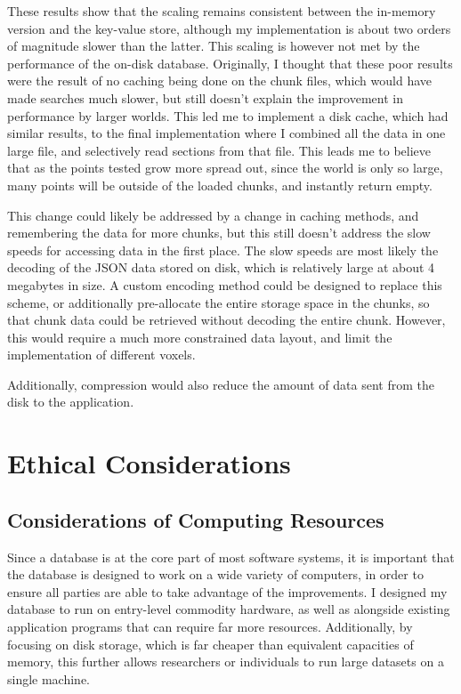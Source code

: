 \documentclass[10pt,twocolumn]{article}
\begin{document}
These results show that the scaling remains consistent between the in-memory
version and the key-value store, although my implementation is about two orders
of magnitude slower than the latter. This scaling is however not met by the
performance of the on-disk database. Originally, I thought that these poor
results were the result of no caching being done on the chunk files, which would
have made searches much slower, but still doesn't explain the improvement in
performance by larger worlds. This led me to implement a disk cache, which had
similar results, to the final implementation where I combined all the data in
one large file, and selectively read sections from that file. This leads me to
believe that as the points tested grow more spread out, since the world is only
so large, many points will be outside of the loaded chunks, and instantly return
empty.

This change could likely be addressed by a change in caching methods, and
remembering the data for more chunks, but this still doesn't address the slow
speeds for accessing data in the first place. The slow speeds are most likely
the decoding of the JSON data stored on disk, which is relatively large at
about 4 megabytes in size. A custom encoding method could be designed to replace
this scheme, or additionally pre-allocate the entire storage space in the
chunks, so that chunk data could be retrieved without decoding the entire chunk.
However, this would require a much more constrained data layout, and limit the
implementation of different voxels.

Additionally, compression would also reduce the amount of data sent from the
disk to the application.

\section{Ethical Considerations}

\subsection{Considerations of Computing Resources}

Since a database is at the core part of most software systems, it is important
that the database is designed to work on a wide variety of computers, in order
to ensure all parties are able to take advantage of the improvements. I
designed my database to run on entry-level commodity hardware, as well as
alongside existing application programs that can require far more resources.
Additionally, by focusing on disk storage, which is far cheaper than equivalent
capacities of memory, this further allows researchers or individuals to run
large datasets on a single machine.
\end{document}
